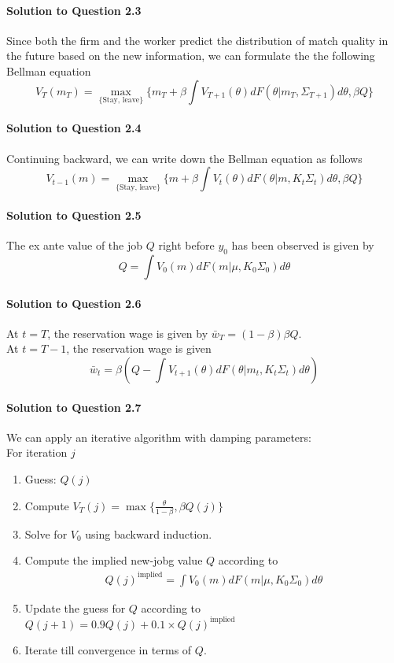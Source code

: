 \documentclass[11pt]{article}
\theoremstyle{definition}
\theoremstyle{boldtitle} %
\numberwithin{equation}{section}
\numberwithin{figure}{section}
\numberwithin{table}{section}
\begin{document}
\paragraph{Solution to Question 2.3}
Since both the firm and the worker predict the distribution of match quality in the future based on the new information,
we can formulate the the following Bellman equation 
\[
V_{T}(m_T) = \max_{\{\text{Stay, leave} \}} \bigg\{m_T + \beta \int V_{T+1}(\theta) dF(\theta | m_T, \Sigma_{T+1}) d\theta , \beta Q \bigg\}
\]

\paragraph{Solution to Question 2.4}
Continuing backward, we can write down the Bellman equation as follows
\[
V_{t-1}(m) = \max_{\{\text{Stay, leave} \}} \bigg\{m + \beta \int V_{t}(\theta) dF(\theta | m, K_t\Sigma_{t}) d\theta , \beta Q \bigg\}
\]

\paragraph{Solution to Question 2.5}
The ex ante value of the job $Q$ right before $y_0$ has been observed is given by 
\[
Q = \int V_0(m) dF(m|\mu, K_0\Sigma_0)d\theta 
\]

\paragraph{Solution to Question 2.6}
At $t=T$, the reservation wage is given by $\bar{w}_T = (1- \beta)\beta Q$.
\\
At $t=T-1$, the reservation wage is given
\[
\bar{w}_t = \beta \left( Q - \int V_{t+1}(\theta)dF(\theta| m_t, K_t\Sigma_t) d\theta \right)
\]

\paragraph{Solution to Question 2.7}
We can apply an iterative algorithm with damping parameters:
\\
\noindent For iteration $j$
\begin{enumerate}
    \item Guess: $Q(j)$
    \item Compute $V_T(j) = \max \{\frac{\theta}{1 - \beta}, \beta Q(j) \}$
    \item Solve for $V_0$ using backward induction.
    \item Compute the implied new-jobg value $Q$ according to 
    \begin{align*}
        Q(j)^{\text{implied}} = \int V_0(m) dF(m|\mu, K_0\Sigma_0)d\theta 
    \end{align*}
    \item Update the guess for $Q$ according to $Q(j+1) = 0.9 Q(j) + 0.1 \times Q(j)^{\text{implied}}$
    \item Iterate till convergence in terms of $Q$.
\end{enumerate}
\end{document}
